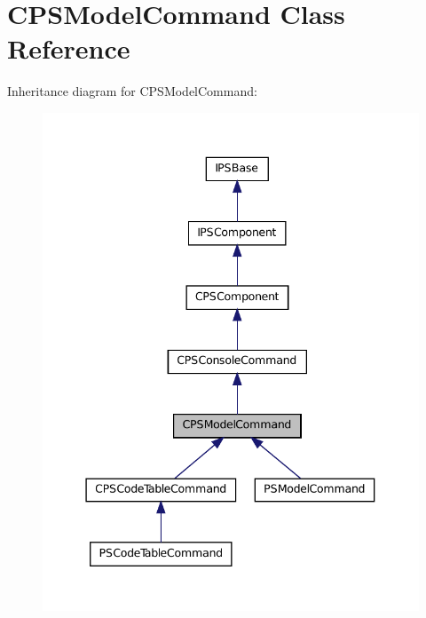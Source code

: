 \hypertarget{classCPSModelCommand}{
\section{CPSModelCommand Class Reference}
\label{classCPSModelCommand}
}


Inheritance diagram for CPSModelCommand:\nopagebreak
\begin{figure}[H]
\begin{center}
\leavevmode
\includegraphics[width=340pt]{classCPSModelCommand__inherit__graph}
\end{center}
\end{figure}


